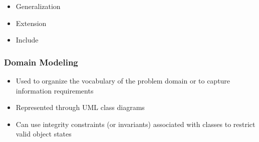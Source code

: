 \documentclass[../ESOF_notes.tex]{subfiles}
\begin{document}
\begin{itemize}
    \item Generalization
    \item Extension
    \item Include
\end{itemize}

\subsubsection{Domain Modeling}
\begin{itemize}
    \item Used to organize the vocabulary of the problem domain or to capture information requirements
    \item Represented through UML class diagrams
    \item Can use integrity constraints (or invariants) associated with classes to restrict valid object states
\end{itemize}
\end{document}
